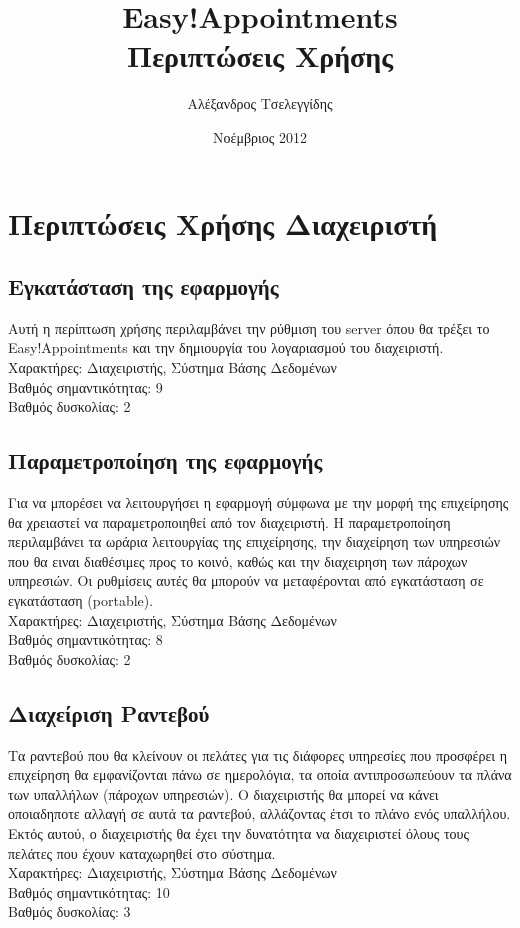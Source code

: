 \documentclass[12pt]{article}
\title{{\Huge {\bf Easy!Appointments}} \\[0.3cm] Περιπτώσεις Χρήσης}
\author{Αλέξανδρος Τσελεγγίδης}
\date{Νοέμβριος 2012}
\begin{document}
\maketitle 
\thispagestyle{empty} %
\pagebreak

\section {Περιπτώσεις Χρήσης Διαχειριστή}
\subsection{Εγκατάσταση της εφαρμογής}
Αυτή η περίπτωση χρήσης περιλαμβάνει την ρύθμιση του server όπου θα τρέξει το Easy!Appointments και την δημιουργία του λογαριασμού του διαχειριστή.
\\[0.3cm]
Χαρακτήρες: Διαχειριστής, Σύστημα Βάσης Δεδομένων
\\[0.3cm]
Βαθμός σημαντικότητας: 9
\\[0.3cm]
Βαθμός δυσκολίας: 2

\subsection{Παραμετροποίηση της εφαρμογής}
Για να μπορέσει να λειτουργήσει η εφαρμογή σύμφωνα με την μορφή της επιχείρησης θα χρειαστεί να παραμετροποιηθεί από τον διαχειριστή. Η παραμετροποίηση περιλαμβάνει τα ωράρια λειτουργίας της επιχείρησης, την διαχείρηση των υπηρεσιών που θα ειναι διαθέσιμες προς το κοινό, καθώς και την διαχειρηση των πάροχων υπηρεσιών. Οι ρυθμίσεις αυτές θα μπορούν να μεταφέρονται από εγκατάσταση σε εγκατάσταση (portable).
\\[0.3cm]
Χαρακτήρες: Διαχειριστής, Σύστημα Βάσης Δεδομένων
\\[0.3cm]
Βαθμός σημαντικότητας: 8
\\[0.3cm]
Βαθμός δυσκολίας: 2

\subsection{Διαχείριση Ραντεβού}
Τα ραντεβού που θα κλείνουν οι πελάτες για τις διάφορες υπηρεσίες που προσφέρει η επιχείρηση θα εμφανίζονται πάνω σε ημερολόγια, τα οποία αντιπροσωπεύουν τα πλάνα των υπαλλήλων (πάροχων υπηρεσιών). Ο διαχειριστής θα μπορεί να κάνει οποιαδηποτε αλλαγή σε αυτά τα ραντεβού, αλλάζοντας έτσι το πλάνο ενός υπαλλήλου. Εκτός αυτού, ο διαχειριστής θα έχει την δυνατότητα να διαχειριστεί όλους τους πελάτες που έχουν καταχωρηθεί στο σύστημα.
\\[0.3cm]
Χαρακτήρες: Διαχειριστής, Σύστημα Βάσης Δεδομένων
\\[0.3cm]
Βαθμός σημαντικότητας: 10
\\[0.3cm]
Βαθμός δυσκολίας: 3
\end{document}
